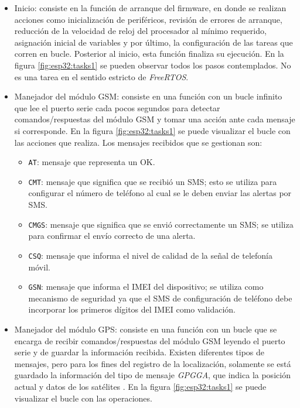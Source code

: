 \begin{itemize}
	\item Inicio: consiste en la función de arranque del firmware, en donde se realizan acciones como inicialización de periféricos, revisión de errores de arranque, reducción de la velocidad de reloj del procesador al mínimo requerido, asignación inicial de variables y por último, la configuración de las tareas que corren en bucle. Posterior al inicio, esta función finaliza su ejecución. En la figura \ref{fig:esp32:tasks1} se pueden observar todos los pasos contemplados. No es una tarea en el sentido estricto de \textit{FreeRTOS}.
	\item Manejador del módulo GSM: consiste en una función con un bucle infinito que lee el puerto serie cada pocos segundos para detectar comandos/respuestas del módulo GSM y tomar una acción ante cada mensaje si corresponde. En la figura \ref{fig:esp32:tasks1} se puede visualizar el bucle con las acciones que realiza. Los mensajes recibidos que se gestionan son:
		\begin{itemize}
			\item \texttt{AT}: mensaje que representa un OK.
			\item \texttt{CMT}: mensaje que significa que se recibió un SMS; esto se utiliza para configurar el número de teléfono al cual se le deben enviar las alertas por SMS.
			\item \texttt{CMGS}: mensaje que significa que se envió correctamente un SMS; se utiliza para confirmar el envío correcto de una alerta.
			\item \texttt{CSQ}: mensaje que informa el nivel de calidad de la señal de telefonía móvil.
			\item \texttt{GSN}: mensaje que informa el IMEI del dispositivo; se utiliza como mecanismo de seguridad ya que el SMS de configuración de teléfono debe incorporar los primeros dígitos del IMEI como validación.		
		\end{itemize}
		\item Manejador del módulo GPS: consiste en una función con un bucle que se encarga de recibir comandos/respuestas del módulo GSM leyendo el puerto serie y de guardar la información recibida. Existen diferentes tipos de mensajes, pero para los fines del registro de la localización, solamente se está guardado la información del tipo de mensaje \textit{GPGGA}, que indica la posición actual y datos de los satélites \citep{NMEA:2}. En la figura \ref{fig:esp32:tasks1} se puede visualizar el bucle con las operaciones.
		\begin{figure}[H]

\end{figure}
\end{itemize}
